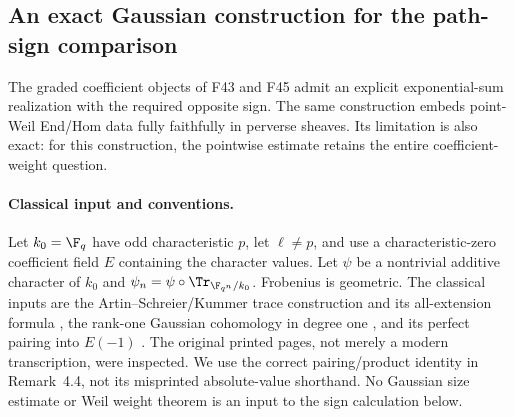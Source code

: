 \documentclass[11pt,a4paper]{article}
\newcommand{\fid}[1]{\textsf{#1}}\newcommand{\gate}[1]{\textsf{#1}}
\theoremstyle{named}\newtheorem{finding}{Finding}[section]
\theoremstyle{definition}\newtheorem{definition}[finding]{Definition}
\theoremstyle{remark}\newtheorem{remark}[finding]{Remark}
\begin{document}
\subsection{An exact Gaussian construction for the path-sign comparison}
The graded coefficient objects of \fid{F43} and \fid{F45} admit an
explicit exponential-sum realization with the required opposite sign.
The same construction embeds point-Weil End/Hom data fully faithfully
in perverse sheaves. Its limitation is also exact: for this construction,
the pointwise estimate retains the entire coefficient-weight question.

\paragraph{Classical input and conventions.}
Let $k_0=\F_q$ have odd characteristic $p$, let $\ell\ne p$, and use a
characteristic-zero coefficient field $E$ containing the character
values. Let $\psi$ be a nontrivial additive character of $k_0$ and
$\psi_n=\psi\circ\Tr_{\F_{q^n}/k_0}$. Frobenius is geometric.
The classical inputs are the Artin--Schreier/Kummer trace construction
and its all-extension formula \cite[\emph{Sommes trig.},
1.7--1.9, especially (1.9.2)]{SGA45}, the rank-one Gaussian
cohomology in degree one \cite[Propositions~4.2--4.3,
pp.~196--197]{SGA45}, and its perfect pairing into $E(-1)$
\cite[Remark~4.4, p.~197]{SGA45}.
The original printed pages, not merely a modern transcription, were
inspected. We use the correct pairing/product identity in Remark~4.4,
not its misprinted absolute-value shorthand. No Gaussian size estimate
or Weil weight theorem is an input to the sign calculation below.
\end{document}
